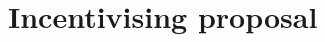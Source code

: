 \documentclass[11pt,letterpaper,reqno,oneside]{book}
\begin{document}
\chapter{Incentivising proposal}
\label{ch4}














\end{document}
